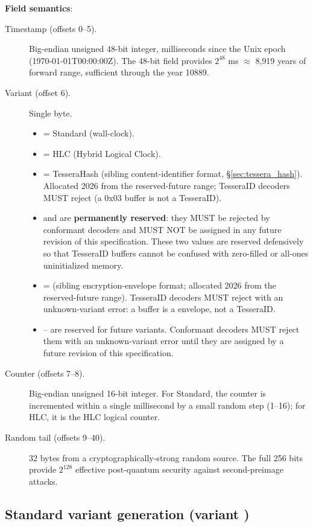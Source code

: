 \textbf{Field semantics}:
\begin{description}
  \item[Timestamp (offsets 0--5).] Big-endian unsigned 48-bit integer, milliseconds since the Unix epoch (1970-01-01T00:00:00Z). The 48-bit field provides $2^{48}$ ms $\approx$ 8{,}919 years of forward range, sufficient through the year 10889.
  \item[Variant (offset 6).] \label{sec:variant-reservation} Single byte.
    \begin{itemize}
      \item {} = Standard (wall-clock).
      \item {} = HLC (Hybrid Logical Clock).
      \item {} = TesseraHash (sibling content-identifier format, §\ref{sec:tessera_hash}). Allocated 2026 from the reserved-future range; TesseraID decoders MUST reject  (a 0x03 buffer is not a TesseraID).
      \item {} and  are \textbf{permanently reserved}: they MUST be rejected by conformant decoders and MUST NOT be assigned in any future revision of this specification. These two values are reserved defensively so that TesseraID buffers cannot be confused with zero-filled or all-ones uninitialized memory.
      \item {} = \tesseraseal{} (sibling encryption-envelope format; allocated 2026 from the reserved-future range). TesseraID decoders MUST reject  with an unknown-variant error: a  buffer is a \tesseraseal{} envelope, not a TesseraID.
      \item {}-- are reserved for future variants. Conformant decoders MUST reject them with an unknown-variant error until they are assigned by a future revision of this specification.
    \end{itemize}
  \item[Counter (offsets 7--8).] Big-endian unsigned 16-bit integer. For Standard, the counter is incremented within a single millisecond by a small random step (1--16); for HLC, it is the HLC logical counter.
  \item[Random tail (offsets 9--40).] 32 bytes from a cryptographically-strong random source. The full 256 bits provide $2^{128}$ effective post-quantum security against second-preimage attacks.
\end{description}

\subsection{Standard variant generation (variant )}

